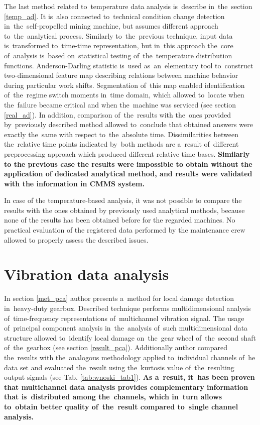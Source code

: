 The last method related to~temperature data analysis is~describe in~the~section \ref{temp_ad}. It is~also connected to~technical condition change detection in~the~self-propelled mining machine, but assumes different approach to~the~analytical process. Similarly to~the~previous technique, input data is~transformed to~time-time representation, but in~this approach the~core of~analysis is~based on~statistical testing of~the~temperature distribution functions. Anderson-Darling statistic is~used as~an~elementary tool to~construct two-dimensional feature map describing relations between machine behavior during particular work shifts. Segmentation of~this map enabled identification of~the~regime switch moments in~time domain, which allowed to~locate when the~failure became critical and when the~machine was serviced (see section \ref{real_ad}). In addition, comparison of~the~results with the~ones provided by~previously described method allowed to~conclude that obtained answers were exactly the~same with respect to~the~absolute time. Dissimilarities between the~relative time points indicated by~both methods are a~result of~different preprocessing approach which produced different relative time bases. \textbf{Similarly to the previous case the results were impossible to obtain without the application of dedicated analytical method, and results were validated with the information in CMMS system.} 

In case of the temperature-based analysis, it was not possible to compare the results with the ones obtained by previously used analytical methods, because none of the results has been obtained before for the regarded machines. No practical evaluation of the registered data performed by the maintenance crew allowed to properly assess the described issues.

\section{Vibration data analysis}

In section \ref{met_pca} author presents a~method for local damage detection in~heavy-duty gearbox. Described technique performs multidimensional analysis of~time-frequency representations of~multichannel vibration signal. The usage of~principal component analysis in~the~analysis of~such multidimensional data structure allowed to~identify local damage on~the~gear wheel of~the~second shaft of~the~gearbox (see section \ref{result_pca}). Additionally author compared the~results with the~analogous methodology applied to~individual channels of~he data set and evaluated the~result using the~kurtosis value of~the~resulting output signals (see Tab. \ref{tab:wnoski_tab1}). \textbf{As a~result, it~has been proven that multichannel data analysis provides complementary information that is~distributed among the~channels, which in~turn allows to~obtain better quality of~the~result compared to~single channel analysis.}

